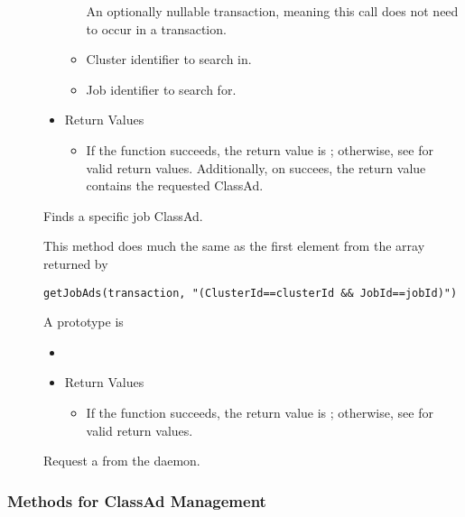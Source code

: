\begin{description}
\begin{itemize}
\begin{itemize}
      An optionally nullable transaction, meaning this call does not 
      need to occur in a transaction. 
      \item[]  

      Cluster identifier to search in.
      \item[] 

      Job identifier to search for.
    \end{itemize}
    \item[] Return Values
    \begin{itemize}
      \item[] If the function succeeds, the return value is ; 
      otherwise, see  for valid return values. Additionally,
      on succees, the return value contains the requested ClassAd.
    \end{itemize}
  \end{itemize}

  Finds a specific job ClassAd. 

  This method does much the same as the first element from the array 
  returned by

\footnotesize
\begin{verbatim}
getJobAds(transaction, "(ClusterId==clusterId && JobId==jobId)")
\end{verbatim}
\normalsize


\item [\Code{requestReschedule}]
  A prototype is 

  \begin{itemize}
    \item[] 
    \item[] Return Values
    \begin{itemize}
      \item[] If the function succeeds, the return value is ; 
      otherwise, see  for valid return values.
    \end{itemize}
  \end{itemize} 

  Request a  from the  daemon.
   
\end{description}

\subsubsection{\label{WebService-ClassAdManagement} Methods for ClassAd Management}

